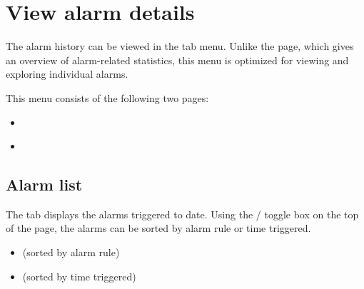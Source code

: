 \documentclass[letterpaper,10pt,english]{sphinxmanual}
\begin{document}
\chapter{View alarm details}
\label{\detokenize{anomaly/part05/index:id1}}\label{\detokenize{anomaly/part05/index::doc}}
The alarm history can be viewed in the  tab menu. Unlike the {\hyperref[\detokenize{anomaly/part03/index:statistics}]{}} page, which gives an overview of alarm-related statistics, this menu is optimized for viewing and exploring individual alarms.

This menu consists of the following two pages:
\begin{itemize}
\item {} 
{\hyperref[\detokenize{anomaly/part05/index:alarm-list}]{}}

\item {} 
{\hyperref[\detokenize{anomaly/part05/index:alarm-details}]{}}

\end{itemize}


\section{Alarm list}
\label{\detokenize{anomaly/part05/index:alarm-list}}\label{\detokenize{anomaly/part05/index:id2}}
The  tab displays the alarms triggered to date. Using the  /  toggle box on the top of the page, the alarms can be sorted by alarm rule or time triggered.
\begin{itemize}
\item {} 
 (sorted by alarm rule)
\begin{quote}

\begin{figure}[H]
\centering

\noindent{}
\end{figure}
\end{quote}

\item {} 
 (sorted by time triggered)
\begin{quote}

\begin{figure}[H]
\centering

\noindent{}
\end{figure}
\end{quote}

\end{itemize}
\end{document}

